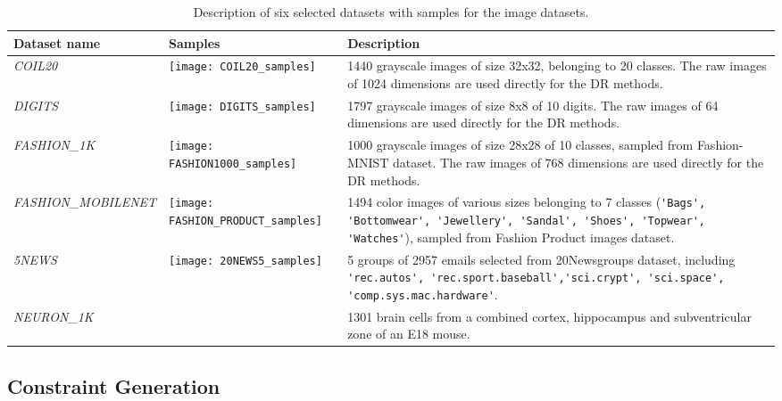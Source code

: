 \begin{table*}%
\caption{Description of six selected datasets with samples for the image datasets.}\label{tbl:dataset}
\begin{tabular}{m{3cm} m{4.8cm} m{8cm}}
\toprule
Dataset name & Samples & Description \\
\midrule

\emph{COIL20}
    & \texttt{[image: COIL20\_samples]}
    & 1440 grayscale images of size 32x32, belonging to 20 classes.
    The raw images of 1024 dimensions are used directly for the DR methods.\\

\emph{DIGITS}
    & \texttt{[image: DIGITS\_samples]}
    & 1797 grayscale images of size 8x8 of 10 digits.
    The raw images of 64 dimensions are used directly for the DR methods.\\

\emph{FASHION\_1K}
    & \texttt{[image: FASHION1000\_samples]}
    & 1000 grayscale images of size 28x28 of 10 classes, sampled from Fashion-MNIST dataset.
    The raw images of 768 dimensions are used directly for the DR methods.\\

\emph{FASHION\_MOBILENET}
    & \texttt{[image: FASHION\_PRODUCT\_samples]}
    & 1494 color images of various sizes belonging to 7 classes
    (\verb|'Bags', 'Bottomwear', 'Jewellery', 'Sandal', 'Shoes', 'Topwear', 'Watches'|),
    sampled from Fashion Product images dataset.\\

\emph{5NEWS}
    & \texttt{[image: 20NEWS5\_samples]}
    & 5 groups of 2957 emails selected from 20Newsgroups dataset,
    including \verb|'rec.autos', 'rec.sport.baseball','sci.crypt', 'sci.space', 'comp.sys.mac.hardware'|. \\

\emph{NEURON\_1K}
    &
    & 1301 brain cells from a combined cortex, hippocampus and subventricular zone of an E18 mouse. \\

\bottomrule
\end{tabular}
\end{table*}


\subsection{Constraint Generation}\label{subsec:constraint_generation}

